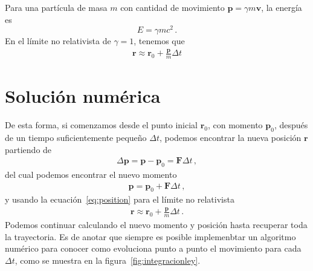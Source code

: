 \documentclass[11pt,a4paper]{book}
\begin{document}
Para una partícula de masa $m$ con cantidad de movimiento $\boldsymbol{p} = \gamma m \boldsymbol{v}$, la energía es
\begin{equation*}
    E=\gamma m c^2\,.
\end{equation*}
En el límite no relativista de $\gamma = 1$, tenemos que
\begin{align}
\label{eq:position}
    \boldsymbol{r} \approx \boldsymbol{r}_0 +\frac{\boldsymbol{p}}{m}\Delta t
\end{align}

\section{Solución numérica}
De esta forma, si comenzamos desde el punto inicial $\boldsymbol{r}_0$, con momento $\boldsymbol{p}_0$, después de un tiempo suficientemente pequeño $\Delta t$, podemos encontrar la nueva posición $\boldsymbol{r}$ partiendo de
\begin{align}
    \Delta\boldsymbol{p} = \boldsymbol{p} -\boldsymbol{p}_0 = \boldsymbol{F} \Delta t\,,
\end{align}
del cual podemos encontrar el nuevo momento
\begin{align}
\label{eq:momento}
    \boldsymbol{p} = \boldsymbol{p}_0 + \boldsymbol{F}\Delta t\,,
\end{align}
y usando la ecuación~\eqref{eq:position} para el límite no relativista
\begin{align*}
    \boldsymbol{r} \approx \boldsymbol{r}_0 +\frac{\boldsymbol{p}}{m}\Delta t\,.
\end{align*}
Podemos continuar calculando el nuevo momento y posición hasta recuperar toda la trayectoria. Es de anotar que siempre es posible implemenbtar un algoritmo numérico para conocer como evoluciona punto a punto el movimiento para cada $\Delta t$, como se muestra en la figura~\ref{fig:integracionley}.
\end{document}
